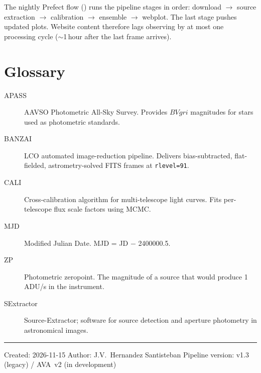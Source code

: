 \documentclass[12pt,a4paper]{article}
\begin{document}
The nightly Prefect flow () runs the pipeline stages in order:
download $\to$ source extraction $\to$ calibration $\to$ ensemble $\to$
webplot.  The last stage pushes updated plots.  Website content therefore
lags observing by at most one processing cycle ($\sim$1\,hour after the last
frame arrives).

\section{Glossary}
\label{app:glossary}

\begin{description}
  \item[APASS] AAVSO Photometric All-Sky Survey.  Provides $BVgri$ magnitudes for
        stars used as photometric standards.
  \item[BANZAI] LCO automated image-reduction pipeline.  Delivers bias-subtracted,
        flat-fielded, astrometry-solved FITS frames at \texttt{rlevel=91}.
  \item[CALI] Cross-calibration algorithm for multi-telescope light curves.  Fits
        per-telescope flux scale factors using MCMC.
  \item[MJD] Modified Julian Date. MJD = JD $-$ 2400000.5.
  \item[ZP] Photometric zeropoint.  The magnitude of a source that would produce
        1 ADU/s in the instrument.
  \item[SExtractor] Source-Extractor; software for source detection and aperture
        photometry in astronomical images.
\end{description}

\vfill
\hrule
\vspace{4pt}
{\small
Created: 2026-11-15 \quad
Author: J.V.\ Hernandez Santisteban \quad
Pipeline version: v1.3 (legacy) / AVA~v2 (in development)
}
\end{document}
